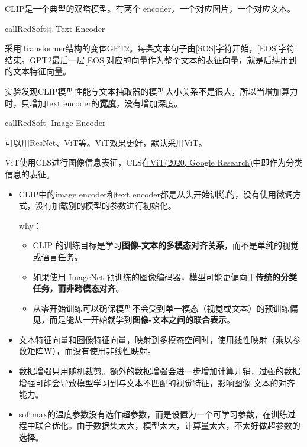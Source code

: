 \documentclass[zihao=false,fontset=windows]{ctexart}
\begin{document}
CLIP是一个典型的双塔模型。有两个 encoder，一个对应图片，一个对应文本。\par
\begin{tcbraster}[raster columns=2, raster equal height=rows, raster column skip=9pt, raster row skip=8pt, raster left skip=0pt, raster right skip=0pt]
\begin{feishuboxnb}{callRedSoft}{💥}
Text Encoder\par
采用Transformer结构的变体GPT2。每条文本句子由[SOS]字符开始，[EOS]字符结束。GPT2最后一层[EOS]对应的向量作为整个文本的表征向量，就是后续用到的文本特征向量。\par
实验发现CLIP模型性能与文本抽取器的模型大小关系不是很大，所以当增加算力时，只增加text encoder的\textbf{宽度}，没有增加深度。\par
\end{feishuboxnb}
\begin{feishuboxnb}{callRedSoft}{📍}
Image Encoder\par
可以用ResNet、ViT等。ViT效果更好，默认采用ViT。\par
ViT使用CLS进行图像信息表征，CLS在\href{https://scnajei2ds6y.feishu.cn/wiki/QEJ8wXq9GiTBrxkMqbScnd8nnod}{ViT(2020, Google Research)}中即作为分类信息的表征。\par
\end{feishuboxnb}
\end{tcbraster}
\par\vspace{0.75em}\par\vspace{0.28em}
\begin{itemize}
\item CLIP中的image encoder和text encoder都是从头开始训练的，没有使用微调方式，没有加载别的模型的参数进行初始化。
\begin{feishuquote}
why：\par
\begin{itemize}
\item CLIP 的训练目标是学习\textbf{图像-文本的多模态对齐关系}，而不是单纯的视觉或语言任务。
\item 如果使用 ImageNet 预训练的图像编码器，模型可能更偏向于\textbf{传统的分类任务，而非跨模态对齐}。
\item 从零开始训练可以确保模型不会受到单一模态（视觉或文本）的预训练偏见，而是能从一开始就学到\textbf{图像-文本之间的联合表示}。
\end{itemize}
\end{feishuquote}
\item 文本特征向量和图像特征向量，映射到多模态空间时，使用线性映射（乘以参数矩阵W），而没有使用非线性映射。
\item 数据增强只用随机裁剪。额外的数据增强会进一步增加计算开销，过强的数据增强可能会导致模型学习到与文本不匹配的视觉特征，影响图像-文本的对齐能力。
\item softmax的温度参数没有选作超参数，而是设置为一个可学习参数，在训练过程中联合优化。由于数据集太大，模型太大，计算量太大，不太好做超参数的选择。
\end{itemize}
\end{document}
